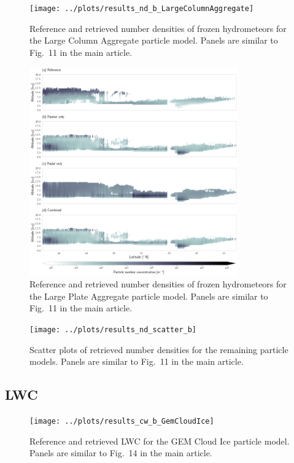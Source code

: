 \documentclass[journal abbreviation, manuscript]{copernicus}
\begin{document}
\begin{figure}[!hbpt]
\centering
\texttt{[image: ../plots/results\_nd\_b\_LargeColumnAggregate]}
\caption{Reference and retrieved number densities of frozen hydrometeors for the
  Large Column Aggregate particle model. Panels are similar to Fig.~11 in the main article.}
\end{figure}
\clearpage

\begin{figure}[!hbpt]
\centering
\includegraphics[width = 0.8\textwidth]{../plots/results_nd_b_LargePlateAggregate}
\caption{Reference and retrieved number densities of frozen hydrometeors for the
  Large Plate Aggregate particle model. Panels are similar to Fig.~11 in the main article.}
\end{figure}
\clearpage

\begin{figure}[!hbpt]
\centering
\texttt{[image: ../plots/results\_nd\_scatter\_b]}
\caption{Scatter plots of retrieved number densities for the remaining particle models. Panels
are similar to Fig.~11 in the main article.}
\end{figure}

\subsection{LWC}

\begin{figure}[!hbpt]
\centering
\texttt{[image: ../plots/results\_cw\_b\_GemCloudIce]}
\caption{Reference and retrieved LWC for the GEM Cloud Ice particle model. Panels are similar to
Fig.~14 in the main article.}
\end{figure}
\clearpage
\end{document}
